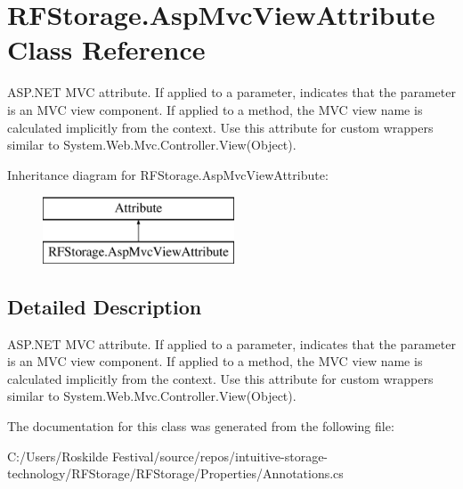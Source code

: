\hypertarget{class_r_f_storage_1_1_asp_mvc_view_attribute}{}\section{R\+F\+Storage.\+Asp\+Mvc\+View\+Attribute Class Reference}
\label{class_r_f_storage_1_1_asp_mvc_view_attribute}


A\+S\+P.\+N\+ET M\+VC attribute. If applied to a parameter, indicates that the parameter is an M\+VC view component. If applied to a method, the M\+VC view name is calculated implicitly from the context. Use this attribute for custom wrappers similar to {\ttfamily System.\+Web.\+Mvc.\+Controller.\+View(\+Object)}.  


Inheritance diagram for R\+F\+Storage.\+Asp\+Mvc\+View\+Attribute\+:\begin{figure}[H]
\begin{center}
\leavevmode
\includegraphics[height=2.000000cm]{class_r_f_storage_1_1_asp_mvc_view_attribute}
\end{center}
\end{figure}


\subsection{Detailed Description}
A\+S\+P.\+N\+ET M\+VC attribute. If applied to a parameter, indicates that the parameter is an M\+VC view component. If applied to a method, the M\+VC view name is calculated implicitly from the context. Use this attribute for custom wrappers similar to {\ttfamily System.\+Web.\+Mvc.\+Controller.\+View(\+Object)}. 



The documentation for this class was generated from the following file\+:\begin{DoxyCompactItemize}
\item 
C\+:/\+Users/\+Roskilde Festival/source/repos/intuitive-\/storage-\/technology/\+R\+F\+Storage/\+R\+F\+Storage/\+Properties/Annotations.\+cs\end{DoxyCompactItemize}
